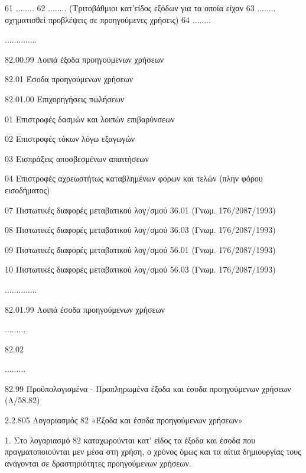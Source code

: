 \documentclass[A4,10pt,greek]{book}
\begin{document}
                               61    ........
                               62    ........ (Τριτοβάθμιοι κατ'είδος εξόδων για τα οποία είχαν
                               63    ........ σχηματισθεί προβλέψεις σε προηγούμενες χρήσεις)
                               64    ........

                     ..............

                     82.00.99    Λοιπά έξοδα προηγούμενων χρήσεων

        82.01    Έσοδα προηγούμενων χρήσεων

                     82.01.00    Επιχορηγήσεις πωλήσεων

                               01    Επιστροφές δασμών και λοιπών επιβαρύνσεων

                               02    Επιστροφές τόκων λόγω εξαγωγών

                               03    Εισπράξεις αποσβεσμένων απαιτήσεων

                               04    Επιστροφές αχρεωστήτως καταβλημένων φόρων και τελών
                                       (πλην φόρου εισοδήματος)

                               07    Πιστωτικές διαφορές μεταβατικού λογ/σμού 36.01
                                       (Γνωμ. 176/2087/1993)

                               08    Πιστωτικές διαφορές μεταβατικού λογ/σμού 36.03
                                       (Γνωμ. 176/2087/1993)

                               09    Πιστωτικές διαφορές μεταβατικού λογ/σμού 56.01
                                       (Γνωμ. 176/2087/1993)

                               10    Πιστωτικές διαφορές μεταβατικού λογ/σμού 56.03
                                       (Γνωμ. 176/2087/1993)

                     ..............

                     82.01.99    Λοιπά έσοδα προηγούμενων χρήσεων

        .........

        82.02

        .........

        82.99    Προϋπολογισμένα - Προπληρωμένα έξοδα και έσοδα προηγούμενων
                        χρήσεων (Λ/58.82)

2.2.805 Λογαριασμός 82 «Έξοδα και έσοδα προηγούμενων χρήσεων»

1. Στο λογαριασμό 82 καταχωρούνται κατ' είδος τα έξοδα και έσοδα που πραγματοποιούνται μεν μέσα στη χρήση, ο χρόνος όμως και τα αίτια δημιουργίας τους ανάγονται σε δραστηριότητες προηγούμενων χρήσεων.
\end{document}
